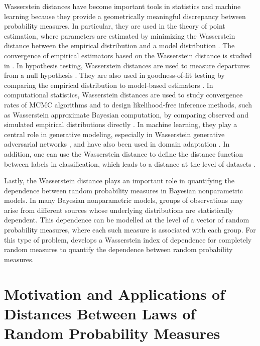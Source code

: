 Wasserstein distances have become important tools in statistics and machine learning because they provide a geometrically meaningful discrepancy between probability measures. In particular, they are used in the theory of point estimation, where parameters are estimated by minimizing the Wasserstein distance between the empirical distribution and a model distribution \cite{basseti2006kantorovich,bernton2019parameter}. The convergence of empirical estimators based on the Wasserstein distance is studied in \cite{bobkov2019one,panaretos2019statistical}. In hypothesis testing, Wasserstein distances are used to measure departures from a null hypothesis \cite{ramdas2017wasserstein,wang2021two,wang2021projected,hu2025two}. They are also used in goodness-of-fit testing by comparing the empirical distribution to model-based estimators \cite{hallin2021multivariate}. In computational statistics, Wasserstein distances are used to study convergence rates of MCMC algorithms \cite{qin2022wasserstein,lavenant2024convergence} and to design likelihood-free inference methods, such as Wasserstein approximate Bayesian computation, by comparing observed and simulated empirical distributions directly \cite{bernton2019abc}. In machine learning, they play a central role in generative modeling, especially in Wasserstein generative adversarial networks \cite{arjovsky2017wasserstein}, and have also been used in domain adaptation \cite{courty2016optimal}. In addition, one can use the Wasserstein distance to define the distance function between labels in classification, which leads to a distance at the level of datasets \cite{alvarezmelis2020geometric}.

Lastly, the Wasserstein distance plays an important role in quantifying the dependence between random probability measures in Bayesian nonparametric models. In many Bayesian nonparametric models, groups of observations may arise from different sources whose underlying distributions are statistically dependent. This dependence can be modelled at the level of a vector of random probability measures, where each such measure is associated with each group. For this type of problem, \cite{catalano2024wasserstein} develops a Wasserstein index of dependence for completely random measures to quantify the dependence between random probability measures.






\section{Motivation and Applications of Distances Between Laws of Random Probability Measures}
\label{section:motivation_applications_distances_on_rpms}

